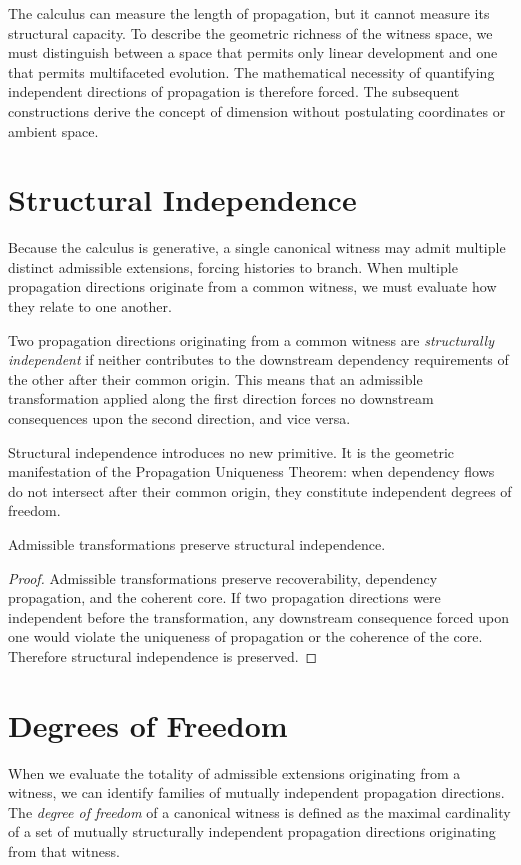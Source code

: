 \documentclass[12pt,anyside]{book}
\newcommand{\term}[1]{\textit{#1}}             %
\begin{document}
The calculus can measure the length of propagation, but it cannot measure its structural capacity. To describe the geometric richness of the witness space, we must distinguish between a space that permits only linear development and one that permits multifaceted evolution. The mathematical necessity of quantifying independent directions of propagation is therefore forced. The subsequent constructions derive the concept of dimension without postulating coordinates or ambient space.

\section{Structural Independence}
Because the calculus is generative, a single canonical witness may admit multiple distinct admissible extensions, forcing histories to branch. When multiple propagation directions originate from a common witness, we must evaluate how they relate to one another. 

Two propagation directions originating from a common witness are \term{structurally independent} if neither contributes to the downstream dependency requirements of the other after their common origin. This means that an admissible transformation applied along the first direction forces no downstream consequences upon the second direction, and vice versa. 

Structural independence introduces no new primitive. It is the geometric manifestation of the Propagation Uniqueness Theorem: when dependency flows do not intersect after their common origin, they constitute independent degrees of freedom.

\begin{theorem}
Admissible transformations preserve structural independence.
\end{theorem}

\begin{proof}
Admissible transformations preserve recoverability, dependency propagation, and the coherent core. If two propagation directions were independent before the transformation, any downstream consequence forced upon one would violate the uniqueness of propagation or the coherence of the core. Therefore structural independence is preserved.
\end{proof}

\section{Degrees of Freedom}
When we evaluate the totality of admissible extensions originating from a witness, we can identify families of mutually independent propagation directions. The \term{degree of freedom} of a canonical witness is defined as the maximal cardinality of a set of mutually structurally independent propagation directions originating from that witness. 
\end{document}
